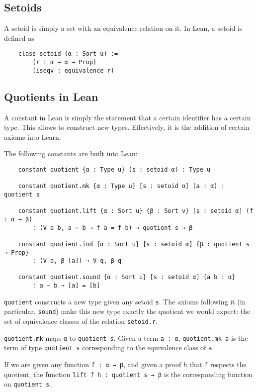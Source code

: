 \documentclass[runningheads,a4paper]{llncs}
\renewcommand{\-}{\setminus}
\begin{document}
\subsection{Setoids}

A setoid is simply a set with an equivalence relation on it. In Lean, a setoid is defined as

\begin{lstlisting}
    class setoid (α : Sort u) :=
        (r : α → α → Prop)
        (iseqv : equivalence r)
\end{lstlisting}

\subsection{Quotients in Lean}

A constant in Lean is simply the statement that a certain identifier has a certain type. This allows to construct new types. Effectively, it is the addition of certain axioms into Learn. 

The following constants are built into Lean:

\begin{lstlisting}
    constant quotient {α : Type u} (s : setoid α) : Type u

    constant quotient.mk {α : Type u} [s : setoid α] (a : α) : quotient s

    constant quotient.lift {α : Sort u} {β : Sort v} [s : setoid α] (f : α → β) 
        : (∀ a b, a ∼ b → f a = f b) → quotient s → β

    constant quotient.ind {α : Sort u} [s : setoid α] {β : quotient s → Prop} 
        : (∀ a, β [a]) → ∀ q, β q

    constant quotient.sound {α : Sort u} [s : setoid α] {a b : α} 
        : a ∼ b → [a] = [b]
\end{lstlisting}

\lstinline{quotient} constructs a new type given any setoid \lstinline{s}. The axioms following it (in particular, \lstinline{sound}) make this new type exactly the quotient we would expect: the set of equivalence classes of the relation \lstinline{setoid.r}.

\lstinline{quotient.mk} maps \lstinline{α} to \lstinline{quotient s}. Given a term \lstinline{a : α}, \lstinline{quotient.mk a} is the term of type \lstinline{quotient s} corresponding to the equivalence class of \lstinline{a}.

If we are given any function \lstinline{f : α → β}, and given a proof \lstinline{h} that \lstinline{f} respects the quotient, the function \lstinline{lift f h : quotient s → β} is the corresponding function on \lstinline{quotient s}.
\end{document}
